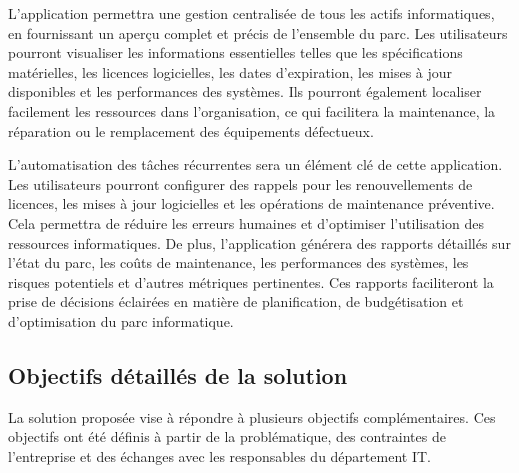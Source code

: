 L'application permettra une gestion centralisée de tous les actifs informatiques, en fournissant un aperçu complet et précis de l'ensemble du parc. Les utilisateurs pourront visualiser les informations essentielles telles que les spécifications matérielles, les licences logicielles, les dates d'expiration, les mises à jour disponibles et les performances des systèmes. Ils pourront également localiser facilement les ressources dans l'organisation, ce qui facilitera la maintenance, la réparation ou le remplacement des équipements défectueux.

L'automatisation des tâches récurrentes sera un élément clé de cette application. Les utilisateurs pourront configurer des rappels pour les renouvellements de licences, les mises à jour logicielles et les opérations de maintenance préventive. Cela permettra de réduire les erreurs humaines et d'optimiser l'utilisation des ressources informatiques. De plus, l'application générera des rapports détaillés sur l'état du parc, les coûts de maintenance, les performances des systèmes, les risques potentiels et d'autres métriques pertinentes. Ces rapports faciliteront la prise de décisions éclairées en matière de planification, de budgétisation et d'optimisation du parc informatique.


\subsection{Objectifs détaillés de la solution}

La solution proposée vise à répondre à plusieurs objectifs complémentaires. Ces objectifs ont été définis à partir de la problématique, des contraintes de l'entreprise et des échanges avec les responsables du département IT.

